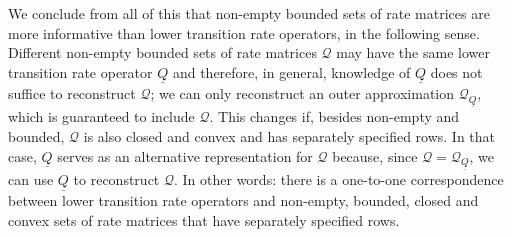 \documentclass[10pt,a4paper]{paper}
\theoremstyle{definition}
\newtheorem{proposition}[theorem]{Proposition}
\newtheorem{lemma}[theorem]{Lemma}
\newcommand{\reals}{\mathbb{R}}
\newcommand{\realsnonneg}{\reals_{\geq 0}}
\newcommand{\states}{\mathcal{X}}
\newcommand{\gambles}{\mathcal{L}}
\newcommand{\gamblesX}{\gambles(\states)}
\newcommand{\rateset}{\mathcal{Q}}
\newcommand{\lrate}{\underline{Q}}
\newcommand{\norm}[1]{\left\lVert #1 \right\rVert}
\newcommand{\coloneqq}{:\!=}
\begin{document}
We conclude from all of this that non-empty bounded sets of rate matrices are more informative than lower transition rate operators, in the following sense. Different non-empty bounded sets of rate matrices $\rateset$ may have the same lower transition rate operator $\lrate$ and therefore, in general, knowledge of $\lrate$ does not suffice to reconstruct $\rateset$; we can only reconstruct an outer approximation $\rateset_{\lrate}$, which is guaranteed to include $\rateset$. This changes if, besides non-empty and bounded, $\rateset$ is also closed and convex and has separately specified rows. In that case, $\lrate$ serves as an alternative representation for $\rateset$ because, since $\rateset=\rateset_{\lrate}$, we can use $\lrate$ to reconstruct $\rateset$. In other words: there is a one-to-one correspondence between lower transition rate operators and non-empty, bounded, closed and convex sets of rate matrices that have separately specified rows.



%
\end{document}
